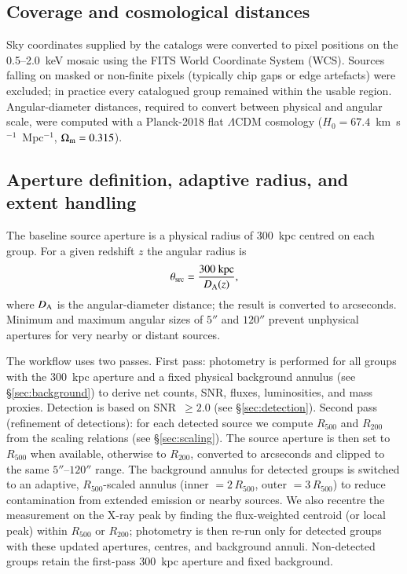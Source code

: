 \documentclass{aa}
\begin{document}
\subsection{Coverage and cosmological distances}
\label{sec:coverage}

Sky coordinates supplied by the catalogs were converted to pixel positions on the 0.5--2.0~keV mosaic using the FITS World Coordinate System (WCS). Sources falling on masked or non-finite pixels (typically chip gaps or edge artefacts) were excluded; in practice every catalogued group remained within the usable region. Angular-diameter distances, required to convert between physical and angular scale, were computed with a Planck-2018 flat $\Lambda$CDM cosmology \citep{Aghanim2020} ($H_0 = 67.4$~km~s$^{-1}$~Mpc$^{-1}$, $\Omega_{\rm m} = 0.315$).

\subsection{Aperture definition, adaptive radius, and extent handling}
\label{sec:aperture}

The baseline source aperture is a physical radius of 300~kpc centred on each group. For a given redshift $z$ the angular radius is
\begin{equation}
\theta_{\rm src} = \frac{300~\mathrm{kpc}}{D_{\rm A}(z)},
\label{eq:theta}
\end{equation}
where $D_{\rm A}$ is the angular-diameter distance; the result is converted to arcseconds. Minimum and maximum angular sizes of $5''$ and $120''$ prevent unphysical apertures for very nearby or distant sources.

The workflow uses two passes. First pass: photometry is performed for all groups with the 300~kpc aperture and a fixed physical background annulus (see \S\ref{sec:background}) to derive net counts, SNR, fluxes, luminosities, and mass proxies. Detection is based on SNR~$\geq 2.0$ (see \S\ref{sec:detection}). Second pass (refinement of detections): for each detected source we compute $R_{500}$ and $R_{200}$ from the scaling relations (see \S\ref{sec:scaling}). The source aperture is then set to $R_{500}$ when available, otherwise to $R_{200}$, converted to arcseconds and clipped to the same $5''$--$120''$ range. The background annulus for detected groups is switched to an adaptive, $R_{500}$-scaled annulus (inner $= 2\,R_{500}$, outer $= 3\,R_{500}$) to reduce contamination from extended emission or nearby sources. We also recentre the measurement on the X-ray peak by finding the flux-weighted centroid (or local peak) within $R_{500}$ or $R_{200}$; photometry is then re-run only for detected groups with these updated apertures, centres, and background annuli. Non-detected groups retain the first-pass 300~kpc aperture and fixed background.
\end{document}
